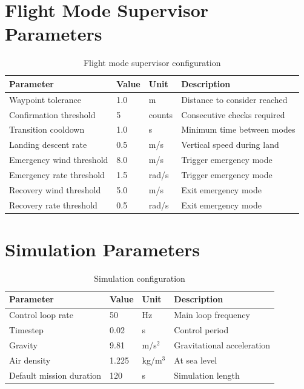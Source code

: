 \section{Flight Mode Supervisor Parameters}

\begin{table}[htbp]
    \centering
    \caption{Flight mode supervisor configuration}
    \label{tab:supervisor_params}
    \begin{tabular}{@{}llll@{}}
        \toprule
        \textbf{Parameter} & \textbf{Value} & \textbf{Unit} & \textbf{Description} \\
        \midrule
        Waypoint tolerance & 1.0 & m & Distance to consider reached \\
        Confirmation threshold & 5 & counts & Consecutive checks required \\
        Transition cooldown & 1.0 & s & Minimum time between modes \\
        Landing descent rate & 0.5 & m/s & Vertical speed during land \\
        Emergency wind threshold & 8.0 & m/s & Trigger emergency mode \\
        Emergency rate threshold & 1.5 & rad/s & Trigger emergency mode \\
        Recovery wind threshold & 5.0 & m/s & Exit emergency mode \\
        Recovery rate threshold & 0.5 & rad/s & Exit emergency mode \\
        \bottomrule
    \end{tabular}
\end{table}

\section{Simulation Parameters}

\begin{table}[htbp]
    \centering
    \caption{Simulation configuration}
    \label{tab:sim_params}
    \begin{tabular}{@{}llll@{}}
        \toprule
        \textbf{Parameter} & \textbf{Value} & \textbf{Unit} & \textbf{Description} \\
        \midrule
        Control loop rate & 50 & Hz & Main loop frequency \\
        Timestep & 0.02 & s & Control period \\
        Gravity & 9.81 & m/s$^2$ & Gravitational acceleration \\
        Air density & 1.225 & kg/m$^3$ & At sea level \\
        Default mission duration & 120 & s & Simulation length \\
        \bottomrule
    \end{tabular}
\end{table}

